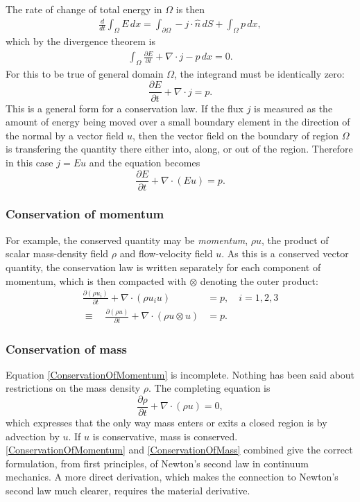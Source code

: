 \documentclass{article}
\begin{document}
The rate of change of total energy in $\Omega$ is then 
\begin{align*}
    \frac{d}{dt} \int_\Omega E\, dx = \int_{\partial\Omega} -j\cdot \hat{n}\, dS + \int_\Omega p\, dx,
\end{align*}
which by the divergence theorem is
\begin{align*}
    \int_\Omega \frac{\partial E}{\partial t} + \nabla \cdot j - p\, dx = 0.
\end{align*}
For this to be true of general domain $\Omega$, the integrand must be identically zero:
\begin{equation}
    \frac{\partial E}{\partial t} + \nabla \cdot j = p.
\end{equation}
This is a general form for a conservation law. If the flux $j$ is measured as the amount of energy being moved over a small boundary element
in the direction of the normal by a vector field $u$, then the vector field on the boundary of region $\Omega$ is transfering the quantity there either into, along, or out of the region. Therefore in this case $j = E u$ and the equation becomes
\begin{equation}
    \frac{\partial E}{\partial t} + \nabla \cdot (E u) = p.
\end{equation}
\subsubsection{Conservation of momentum}
For example, the conserved quantity may be \textit{momentum}, $\rho u$, the product
of scalar mass-density field $\rho$ and flow-velocity field $u$. As this is a conserved vector quantity, the conservation law is written
separately for each component of momentum, which is then compacted with $\otimes$ denoting the outer product:
\begin{equation}\label{ConservationOfMomentum}
\begin{split}
    \frac{\partial(\rho u_i)}{\partial t} + \nabla \cdot \left(\rho u_i u\right) &= p, \quad i=1,2,3\\
    \equiv\quad \frac{\partial(\rho u)}{\partial t} + \nabla \cdot \left(\rho u \otimes u\right) &= p.
\end{split}
\end{equation}
\subsubsection{Conservation of mass}
Equation \eqref{ConservationOfMomentum} is incomplete. Nothing has been said about restrictions on the mass density $\rho$.
The completing equation is
\begin{equation}\label{ConservationOfMass}
    \frac{\partial \rho}{\partial t} + \nabla \cdot (\rho u) = 0,
\end{equation}
which expresses that the only way mass enters or exits a closed region is by advection by $u$. If $u$ is conservative, mass is conserved.
\eqref{ConservationOfMomentum} and \eqref{ConservationOfMass} combined give the correct formulation, from first principles, of Newton's second law in continuum mechanics.
A more direct derivation, which makes the connection to Newton's second law much clearer, requires the material derivative.
\end{document}
